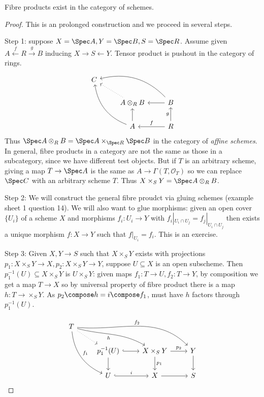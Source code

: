 \documentclass[a4paper]{article}
\newcommand{\sh}[1]{\mathcal{#1}} %
\begin{document}
\begin{theorem}
  Fibre products exist in the category of schemes.
\end{theorem}

\begin{proof}
  This is an prolonged construction and we proceed in several steps.

  Step 1: suppose \(X = \Spec A, Y = \Spec B, S = \Spec R\). Assume given \(A \xleftarrow{f} R \xrightarrow{g} B\) inducing \(X \to S \leftarrow Y\). Tensor product is pushout in the category of rings.
  \[
    \begin{tikzcd}
      C \\
      & A \otimes_R B \ar[ul, dotted] & B \ar[l] \ar[ull, bend right] \\
      & A \ar[u] \ar[uul, bend left] & R \ar[l, "f"'] \ar[u, "g"]
    \end{tikzcd}
  \]
  Thus \(\Spec A \otimes_R B = \Spec A \times_{\Spec R} \Spec B\) in the category of \emph{affine schemes}. In general, fibre products in a category are not the same as those in a subcategory, since we have different test objects. But if \(T\) is an arbitrary scheme, giving a map \(T \to \Spec A\) is the same as \(A \to \Gamma(T, \sh O_T)\) so we can replace \(\Spec C\) with an arbitrary scheme \(T\). Thus \(X \times_S Y = \Spec A \otimes_R B\).

  Step 2: We will construct the general fibre proudct via gluing schemes (example sheet 1 question 14). We will also want to glue morphisms: given an open cover \(\{U_i\}\) of a scheme \(X\) and morphisms \(f_i: U_i \to Y\) with \(f_i|_{U_i \cap U_j} = f_j|_{U_i \cap U_j}\) then exists a unique morphism \(f: X \to Y\) such that \(f|_{U_i} = f_i\). This is an exercise.

  Step 3: Given \(X, Y \to S\) such that \(X \times_S Y\) exists with projections \(p_1: X \times_S Y \to X, p_2: X \times_S Y \to Y\), suppose \(U \subseteq X\) is an open subscheme. Then \(p_1^{-1}(U) \subseteq X \times_S Y\) is \(U \times_S Y\): given maps \(f_1: T \to U, f_2: T \to Y\), by composition we get a map \(T \to X\) so by universal property of fibre product there is a map \(h: T \to \times_S Y\). As \(p_2 \compose h = i \compose f_1\), must have \(h\) factors through \(p_1^{-1}(U)\).
  \[
    \begin{tikzcd}
      T \ar[drrr, out=-5, "f_2"] \ar[drr, "h"', out=-15, in=150] \ar[dr, dotted] \ar[ddr, "f_1", bend right] \\
      & p_1^{-1}(U) \ar[r, hook] \ar[d] & X \times_S Y \ar[r, "p_2"] \ar[d, "p_1"] & Y \ar[d] \\
      & U \ar[r, "i", hook] & X \ar[r] & S
    \end{tikzcd}
  \]


\end{proof}
\end{document}
